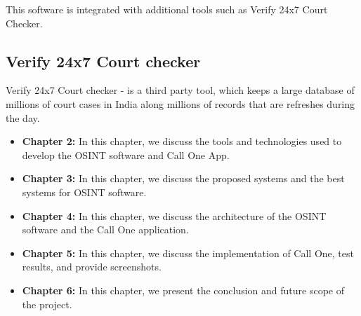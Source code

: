 This software is integrated with additional tools such as Verify 24x7 Court Checker.
\subsection{Verify 24x7 Court checker}\label{subsec:verify-24x7-court-checker}

Verify 24x7 Court checker - is a third party tool, which keeps a large database of millions of court cases in India along millions of records that are refreshes during the day.


\begin{itemize}
    \item \textbf{Chapter 2:}
    In this chapter, we discuss the tools and technologies used to develop the OSINT software and Call One App.

    \item \textbf{Chapter 3:}
    In this chapter, we discuss the proposed systems and the best systems for OSINT software.

    \item \textbf{Chapter 4:}
    In this chapter, we discuss the architecture of the OSINT software and the Call One application.

    \item \textbf{Chapter 5:}
    In this chapter, we discuss the implementation of Call One, test results, and provide screenshots.

    \item \textbf{Chapter 6:}
    In this chapter, we present the conclusion and future scope of the project.

\end{itemize}


